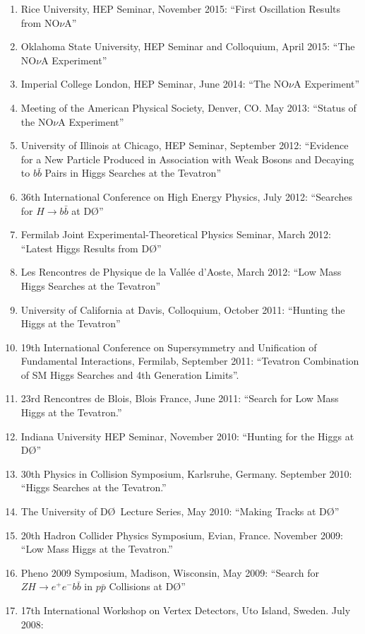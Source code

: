 \documentclass[amsmath,amssymb]{revtex4}
\def\dzero{D\O}
\begin{document}
\begin{enumerate}
\item Rice University, HEP Seminar, November 2015: 
``First Oscillation Results from NO$\nu$A''
\item Oklahoma State University, HEP Seminar and Colloquium, April 2015:
``The NO$\nu$A Experiment''
\item Imperial College London, HEP Seminar, June 2014:
``The NO$\nu$A Experiment''
\item  Meeting of the American Physical Society, Denver, CO.  May 2013:
``Status of the NO$\nu$A Experiment''
\item University of Illinois at Chicago, HEP Seminar, September 2012:
``Evidence for a New Particle Produced in Association with Weak Bosons 
  and Decaying to $b\bar{b}$ Pairs in Higgs Searches at the Tevatron''
\item 36th International Conference on High Energy Physics, July 2012:
``Searches for $H\to b\bar{b}$ at \dzero''
\item Fermilab Joint Experimental-Theoretical Physics Seminar, March 2012:
``Latest Higgs Results from \dzero''
\item Les Rencontres de Physique de la Vallée d'Aoste, March 2012:
``Low Mass Higgs Searches at the Tevatron''
\item University of California at Davis, Colloquium, October 2011:
``Hunting the Higgs at the Tevatron''
\item 19th International Conference on Supersymmetry and Unification of Fundamental Interactions,
Fermilab, September 2011:
``Tevatron Combination of SM Higgs Searches and 4th Generation Limits''.
\item 23rd Rencontres de Blois, Blois France, June 2011:
``Search for Low Mass Higgs at the Tevatron.''
\item Indiana University HEP Seminar, November 2010:
``Hunting for the Higgs at \dzero''
\item 30th Physics in Collision Symposium, Karlsruhe, Germany.  September 2010:
``Higgs Searches at the Tevatron.''
\item The University of \dzero~Lecture Series, May 2010: ``Making Tracks at \dzero''
\item 20th Hadron Collider Physics Symposium, Evian, France. November 2009:
``Low Mass Higgs at the Tevatron.''
\item Pheno 2009 Symposium, Madison, Wisconsin, May 2009: 
``Search for $ZH\to e^+e^-b{\bar b}$ in $p\bar{p}$ Collisions at \dzero''
\item 17th International Workshop on Vertex Detectors, Uto Island, Sweden.  July 2008:

\end{enumerate}
\end{document}

